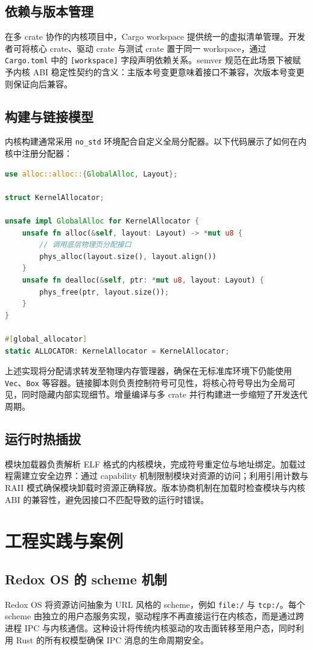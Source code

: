 \section{依赖与版本管理}
在多 crate 协作的内核项目中，Cargo workspace 提供统一的虚拟清单管理。开发者可将核心 crate、驱动 crate 与测试 crate 置于同一 workspace，通过 \texttt{Cargo.toml} 中的 \texttt{[workspace]} 字段声明依赖关系。semver 规范在此场景下被赋予内核 ABI 稳定性契约的含义：主版本号变更意味着接口不兼容，次版本号变更则保证向后兼容。\par
\section{构建与链接模型}
内核构建通常采用 \texttt{no\_{}std} 环境配合自定义全局分配器。以下代码展示了如何在内核中注册分配器：\par
\begin{lstlisting}[language=rust]
use alloc::alloc::{GlobalAlloc, Layout};

struct KernelAllocator;

unsafe impl GlobalAlloc for KernelAllocator {
    unsafe fn alloc(&self, layout: Layout) -> *mut u8 {
        // 调用底层物理页分配接口
        phys_alloc(layout.size(), layout.align())
    }
    unsafe fn dealloc(&self, ptr: *mut u8, layout: Layout) {
        phys_free(ptr, layout.size());
    }
}

#[global_allocator]
static ALLOCATOR: KernelAllocator = KernelAllocator;
\end{lstlisting}
上述实现将分配请求转发至物理内存管理器，确保在无标准库环境下仍能使用 \texttt{Vec}、\texttt{Box} 等容器。链接脚本则负责控制符号可见性，将核心符号导出为全局可见，同时隐藏内部实现细节。增量编译与多 crate 并行构建进一步缩短了开发迭代周期。\par
\section{运行时热插拔}
模块加载器负责解析 ELF 格式的内核模块，完成符号重定位与地址绑定。加载过程需建立安全边界：通过 capability 机制限制模块对资源的访问；利用引用计数与 RAII 模式确保模块卸载时资源正确释放。版本协商机制在加载时检查模块与内核 ABI 的兼容性，避免因接口不匹配导致的运行时错误。\par
\chapter{工程实践与案例}
\section{Redox OS 的 scheme 机制}
Redox OS 将资源访问抽象为 URL 风格的 scheme，例如 \texttt{file:/} 与 \texttt{tcp:/}。每个 scheme 由独立的用户态服务实现，驱动程序不再直接运行在内核态，而是通过跨进程 IPC 与内核通信。这种设计将传统内核驱动的攻击面转移至用户态，同时利用 Rust 的所有权模型确保 IPC 消息的生命周期安全。\par
